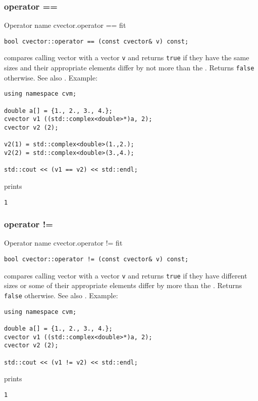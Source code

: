 \subsubsection{operator ==}
Operator%
\pdfdest name {cvector.operator ==} fit
\begin{verbatim}
bool cvector::operator == (const cvector& v) const;
\end{verbatim}
compares  calling vector with a vector \verb"v"
and returns \verb"true" if they have the same sizes
and their appropriate elements differ by not more than the
.
Returns \verb"false" otherwise.
See also .
Example:
\begin{Verbatim}
using namespace cvm;

double a[] = {1., 2., 3., 4.};
cvector v1 ((std::complex<double>*)a, 2);
cvector v2 (2);

v2(1) = std::complex<double>(1.,2.);
v2(2) = std::complex<double>(3.,4.);

std::cout << (v1 == v2) << std::endl;
\end{Verbatim}
prints
\begin{Verbatim}
1
\end{Verbatim}
\newpage



\subsubsection{operator !=}
Operator%
\pdfdest name {cvector.operator !=} fit
\begin{verbatim}
bool cvector::operator != (const cvector& v) const;
\end{verbatim}
compares  calling vector with a vector \verb"v"
and returns \verb"true" if they have different sizes
or some of their appropriate elements
differ by more than the
.
Returns \verb"false" otherwise.
See also .
Example:
\begin{Verbatim}
using namespace cvm;

double a[] = {1., 2., 3., 4.};
cvector v1 ((std::complex<double>*)a, 2);
cvector v2 (2);

std::cout << (v1 != v2) << std::endl;
\end{Verbatim}
prints
\begin{Verbatim}
1
\end{Verbatim}
\newpage



